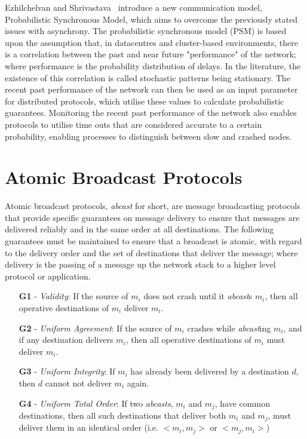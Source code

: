 Ezhilchelvan and Shrivastava~\cite{Ezhilchelvan:2010:LPR:1773912.1773927} introduce a new communication model, Probabilistic Synchronous Model, which aims to overcome the previously stated issues with asynchrony. The probabilistic synchronous model (PSM) is based upon the assumption that, in datacentres and cluster-based environments, there is a correlation between the past and near future "performance" of the network; where performance is the probability distribution of delays. In the literature, the existence of this correlation is called stochastic patterns being stationary. The recent past performance of the network can then be used as an input parameter for distributed protocols, which utilise these values to calculate probabilistic guarantees. Monitoring the recent past performance of the network also enables protocols to utilise time outs that are considered accurate to a certain probability, enabling processes to distinguish between slow and crashed nodes. 


\section{Atomic Broadcast Protocols} \label{atomic_guarantees}
Atomic broadcast protocols, \emph{abcast} for short, are message broadcasting protocols that provide specific guarantees on message delivery to ensure that messages are delivered reliably and in the same order at all destinations.  The following guarantees must be maintained to ensure that a broadcast is atomic, with regard to the delivery order and the set of destinations that deliver the message; where delivery is the passing of a message up the network stack to a higher level protocol or application.  

\begin{itemize}
    \item [\textbf{G1}] - \emph{Validity}: If the source of $m_i$ does not crash until it \emph{abcast}s $m_i$, then all operative destinations of $m_i$ deliver $m_i$.
    \item [\textbf{G2}] - \emph{Uniform Agreement}: If the source of $m_i$ crashes while \emph{abcast}ing $m_i$, and if any destination delivers $m_i$, then all operative
destinations of $m_i$ must deliver $m_i$.
    \item [\textbf{G3}] - \emph{Uniform Integrity}: If $m_i$ has already been delivered by a destination $d$, then $d$ cannot not deliver $m_i$ again.  
    \item [\textbf{G4}] - \emph{Uniform Total Order}: If two \emph{\emph{abcast}s}, $m_i$ and $m_j$, have
common destinations, then all such destinations that deliver both $m_i$ and $m_j$, must deliver them in an identical order (i.e. $<m_i, m_j>$ or $<m_j, m_i>$)
\end{itemize}

